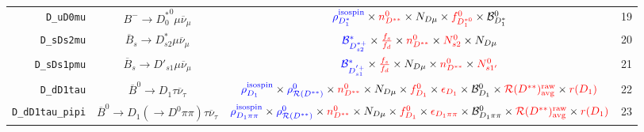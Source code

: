 \begin{landscape}
\begin{table}
\begin{tabular}{r|c|c|l}
        \texttt{D\_uD0mu} &                  $B^- \rightarrow {D^*_0}^0 \mu \overline{\nu}_\mu$                  &                                                                                                     $\textcolor{blue}{\rho^\text{isospin}_{D_1^*}} \times \textcolor{red}{n^{0}_{D^{**}}} \times N_{D \mu} \times \textcolor{red}{f^{0}_{D_1^{*0}}} \times \mathcal{B}^{0}_{D_1^*}$                                                                                                      & 19               \\
       \texttt{D\_sDs2mu} &             $\overline{B}_s \rightarrow D_{s2}^* \mu \overline{\nu}_\mu$             &                                                                                                    $\textcolor{blue}{\mathcal{B}^{*}_{D_{s2}^{*+}}} \times \textcolor{red}{\frac{f_s}{f_d}} \times \textcolor{red}{n^{0}_{D^{**}}} \times \textcolor{red}{N^0_{s2}} \times N_{D \mu}$                                                                                                    & 20               \\
      \texttt{D\_sDs1pmu} &             $\overline{B}_s \rightarrow D'_{s1} \mu \overline{\nu}_\mu$              &                                                                                                   $\textcolor{blue}{\mathcal{B}^{*}_{D_{s1}^{'+}}} \times \textcolor{red}{\frac{f_s}{f_d}} \times N_{D \mu} \times \textcolor{red}{n^{0}_{D^{**}}} \times \textcolor{red}{N^0_{s1'}}$                                                                                                    & 21               \\
       \texttt{D\_dD1tau} &              $\overline{B}^0 \rightarrow D_1 \tau \overline{\nu}_\tau$               &          $\textcolor{blue}{\rho^\text{isospin}_{D_1}} \times \textcolor{blue}{\rho_{\mathcal{R}(D^{**})}^0} \times \textcolor{red}{n^{0}_{D^{**}}} \times N_{D \mu} \times \textcolor{red}{f^{0}_{D_1}} \times \textcolor{red}{\epsilon_{D_1}} \times \mathcal{B}^{0}_{D_1} \times \textcolor{red}{\mathcal{R}(D^{**})_\text{avg}^\text{raw}} \times \textcolor{red}{r({D_1})}$          & 22               \\
 \texttt{D\_dD1tau\_pipi} &  $\overline{B}^0 \rightarrow D_1 (\rightarrow D^0 \pi\pi) \tau \overline{\nu}_\tau$  & $\textcolor{blue}{\rho^\text{isospin}_{D_1\pi\pi}} \times \textcolor{blue}{\rho_{\mathcal{R}(D^{**})}^0} \times \textcolor{red}{n^{0}_{D^{**}}} \times N_{D \mu} \times \textcolor{red}{f^{0}_{D_1}} \times \textcolor{red}{\epsilon_{D_1\pi\pi}} \times \mathcal{B}^{0}_{D_1\pi\pi} \times \textcolor{red}{\mathcal{R}(D^{**})_\text{avg}^\text{raw}} \times \textcolor{red}{r({D_1})}$ & 23               \\

\end{tabular}
\end{table}
\end{landscape}
